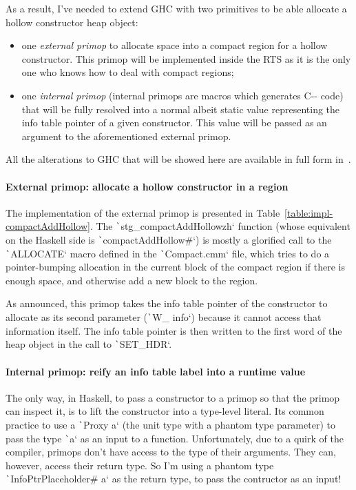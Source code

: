 \documentclass[english]{jflart}
\begin{document}
As a result, I've needed to extend GHC with two primitives to be able allocate a hollow constructor heap object:

\begin{itemize}
\item one \emph{external primop} to allocate space into a compact region for a hollow constructor. This primop will be implemented inside the RTS as it is the only one who knows how to deal with compact regions;
\item one \emph{internal primop} (internal primops are macros which generates C-{}- code) that will be fully resolved  into a normal albeit static value representing the info table pointer of a given constructor. This value will be passed as an argument to the aforementioned external primop.
\end{itemize}

All the alterations to GHC that will be showed here are available in full form in~\cite{custom_ghc}.

\paragraph{External primop: allocate a hollow constructor in a region}

The implementation of the external primop is presented in Table~\ref{table:impl-compactAddHollow}. The \texttt`stg_compactAddHollowzh` function (whose equivalent on the Haskell side is \texttt`compactAddHollow#`) is mostly a glorified call to the \texttt`ALLOCATE` macro defined in the \texttt`Compact.cmm` file, which tries to do a pointer-bumping allocation in the current block of the compact region if there is enough space, and otherwise add a new block to the region.

As announced, this primop takes the info table pointer of the constructor to allocate as its second parameter (\texttt`W_ info`) because it cannot access that information itself. The info table pointer is then written to the first word of the heap object in the call to \texttt`SET_HDR`.

\paragraph{Internal primop: reify an info table label into a runtime value}

The only way, in Haskell, to pass a constructor to a primop so that the primop can inspect it, is to lift the constructor into a type-level literal. Its common practice to use a \texttt`Proxy a` (the unit type with a phantom type parameter) to pass the type \texttt`a` as an input to a function. Unfortunately, due to a quirk of the compiler, primops don't have access to the type of their arguments. They can, however, access their return type. So I'm using a phantom type \texttt`InfoPtrPlaceholder# a` as the return type, to pass the contructor as an input!
\end{document}
